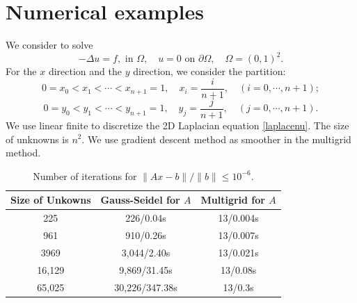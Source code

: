 \section{Numerical examples}
We consider to solve 
\begin{equation}
\label{laplacenu}
-\Delta u = f,  \mbox{ in } \Omega,\quad
u=0  \mbox{ on } \partial\Omega,\quad
\Omega=(0,1)^2.
\end{equation}
For the $x$ direction and the $y$ direction, we consider the partition:
\begin{equation}\label{partitionyx}
 0=x_0<x_1<\cdots<x_{n+1}=1, \quad x_i=\frac{i}{n+1},\quad (i=0,\cdots,n+1);
 \end{equation}
 \begin{equation}\label{partitiony}
 0=y_0<y_1<\cdots<y_{n+1}=1, \quad y_j=\frac{j}{n+1},\quad (j=0,\cdots,n+1).
\end{equation}
We use linear finite to discretize the 2D Laplacian equation \eqref{laplacenu}.  The size of 
unknowns is $n^2$. We use gradient descent method as smoother in the multigrid method. 
\begin{table}\label{table:multivsGS}%
\begin{center}
\begin{tabular}{|c||c|c|}
\hline \hline
Size of Unkowns & Gauss-Seidel for $A$ & Multigrid for $A$ \\ \hline\hline %
225  &  226/0.04s     &    13/0.004s \\ \hline %
961   &  910/0.26s      & 13/0.007s
\\ \hline %
3969   &  3,044/2.40s   &13/0.021s  \\ \hline %
16,129   & 9,869/31.45s    &13/0.08s \\ \hline %
65,025   &  30,226/347.38s  &13/0.3s\\ \hline %
\end{tabular}
\caption{Number of iterations for $\| Ax - b \|/ \|b\| \leq 10^{-6}$.}
\end{center}
\end{table}
